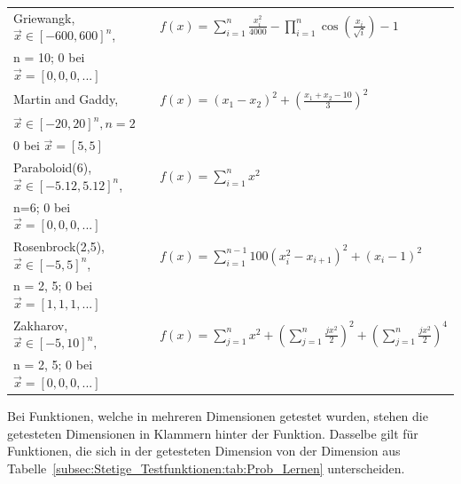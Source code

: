 \documentclass[fontsize=12, a4aper]{scrartcl}
\newcommand\Tstrut{\rule{0pt}{3ex}}           %
\begin{document}
\begin{table}[H]
\begin{tabularx}{\textwidth}{l|l}
			Griewangk, \(\overrightarrow{x} \in [-600, 600]^n\), & \(f(x)=\sum_{i=1}^{n} \frac{x_i^2}{4000} - \prod_{i=1}^{n} \cos(\frac{x_i}{\sqrt{i}}) - 1\)\Tstrut\\
			n = 10; 0 bei \(\overrightarrow{x} = [0, 0, 0, ...]\) & \\
			
			Martin and Gaddy, & \(f(x)=(x_1-x_2)^2 + \left(\frac{x_1+x_2-10}{3}\right)^2\)\Tstrut\\
			\(\overrightarrow{x} \in [-20, 20]^n, n = 2\) & \\
			0 bei \(\overrightarrow{x} = [5, 5]\) & \\
			
			Paraboloid(6), \(\overrightarrow{x} \in [-5.12, 5.12]^n\), & \(f(x)=\sum_{i=1}^{n} x^2\)\Tstrut\\
			n=6; 0 bei \(\overrightarrow{x} = [0, 0, 0, ...]\)& \\
			
			Rosenbrock(2,5), \(\overrightarrow{x} \in [-5,5]^n\),  & \(f(x)=\sum_{i=1}^{n-1} 100 (x^2_i-x_{i+1})^2  + (x_i-1)^2\) \Tstrut\\
			n = 2, 5; 0 bei \(\overrightarrow{x} = [1, 1, 1, ...]\) & \\
			
			Zakharov, \(\overrightarrow{x} \in [-5,10]^n,\) & \(f(x)=\sum_{j=1}^{n} x^2 + \left(\sum_{j=1}^{n} \frac{jx^2}{2}\right)^2 + \left(\sum_{j=1}^{n} \frac{jx^2}{2}\right)^4\)\Tstrut\\
			n = 2, 5; 0 bei \(\overrightarrow{x} = [0, 0, 0, ...]\)
			
		\end{tabularx}
		
		\smallskip
		
		Bei Funktionen, welche in mehreren Dimensionen getestet wurden, stehen die getesteten Dimensionen in Klammern hinter der Funktion. Dasselbe gilt für Funktionen, die sich in der getesteten Dimension von der Dimension aus Tabelle~\ref{subsec:Stetige_Testfunktionen:tab:Prob_Lernen} unterscheiden.
		
	\end{table}
	
\end{document}

